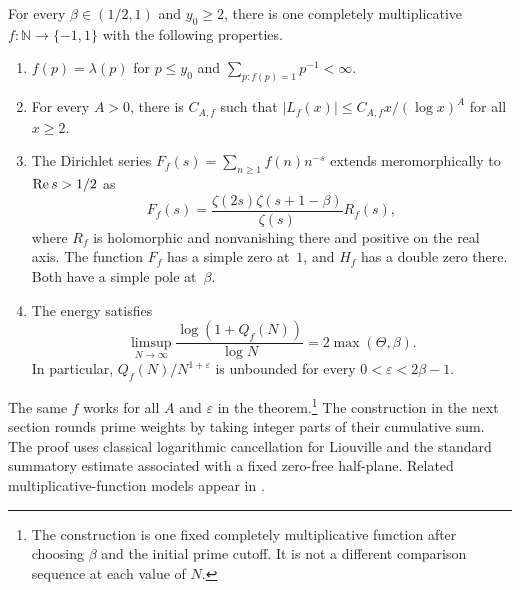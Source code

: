 \begin{theorem}\label{round26:thm:construction}
For every $\beta\in(1/2,1)$ and $y_0\ge2$, there is one completely
multiplicative $f:\mathbb N\to\{-1,1\}$ with the following properties.
\begin{enumerate}
\item $f(p)=\lambda(p)$ for $p\le y_0$ and
  $\sum_{p:f(p)=1}p^{-1}<\infty$.
\item For every $A>0$, there is $C_{A,f}$ such that
  $|L_f(x)|\le C_{A,f}x/(\log x)^A$ for all $x\ge2$.
\item The Dirichlet series $F_f(s)=\sum_{n\ge1}f(n)n^{-s}$ extends
  meromorphically to $\operatorname{Re} s>1/2$ as
  \begin{equation}\label{round26:eq:factorization}
   F_f(s)=\frac{\zeta(2s)\zeta(s+1-\beta)}{\zeta(s)}R_f(s),
  \end{equation}
  where $R_f$ is holomorphic and nonvanishing there and positive on the
  real axis. The function $F_f$ has a simple zero at~$1$, and $H_f$
  has a double zero there. Both have a simple pole at~$\beta$.
\item The energy satisfies
  \begin{equation}\label{round26:eq:exponent}
   \limsup_{N\to\infty}\frac{\log(1+Q_f(N))}{\log N}
      =2\max(\Theta,\beta).
  \end{equation}
  In particular, $Q_f(N)/N^{1+\varepsilon}$ is unbounded for every
  $0<\varepsilon<2\beta-1$.
\end{enumerate}
\end{theorem}

The same $f$ works for all $A$ and $\varepsilon$ in the theorem.\footnote{The construction is one fixed completely multiplicative function after choosing $\beta$ and the initial prime cutoff. It is not a different comparison sequence at each value of $N$.}
The construction in the next section rounds prime weights by taking
integer parts of their cumulative sum. The proof uses classical
logarithmic cancellation for Liouville and the standard summatory
estimate associated with a fixed zero-free half-plane. Related
multiplicative-function models appear in \cite{Round26aymone,Round26aymone-sidoravicius}.

